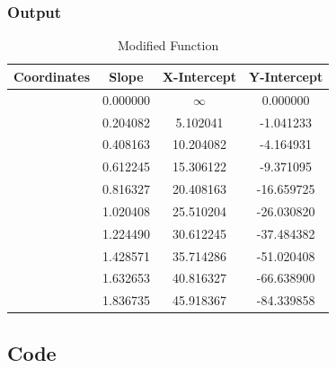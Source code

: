 \subsubsection{Output}

\begin{table}[!ht]
	\begin{center}
		\begin{tabular}{ | c | c | c | c | }
			\hline
			Coordinates	& Slope & X-Intercept & Y-Intercept \\ \hline
			[0.0, 0.0] & 0.000000 & $\infty$ & 0.000000 \\ \hline
			[10.20, 1.04] & 0.204082 & 5.102041 & -1.041233 \\ \hline
			[20.41, 4.16] & 0.408163 & 10.204082 & -4.164931 \\ \hline
			[30.61, 9.37] & 0.612245 & 15.306122 & -9.371095 \\ \hline
			[40.82, 16.66] & 0.816327 & 20.408163 & -16.659725 \\ \hline
			[51.02, 26.03] & 1.020408 & 25.510204 & -26.030820 \\ \hline
			[61.22, 37.48] & 1.224490 & 30.612245 & -37.484382 \\ \hline
			[71.43, 51.021] & 1.428571 & 35.714286 & -51.020408 \\ \hline
			[81.63, 66.64] & 1.632653 & 40.816327 & -66.638900 \\ \hline
			[91.84, 84.34] & 1.836735 & 45.918367 & -84.339858 \\ \hline
		\end{tabular}
	\end{center}
\caption{Modified Function}
\end{table}

\clearpage
\subsection{Code}
